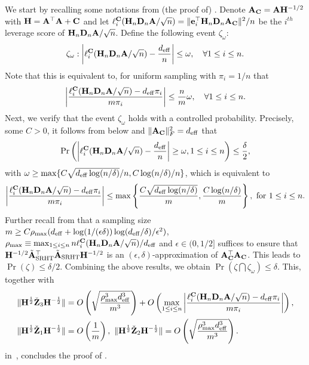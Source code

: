 \documentclass[11pt,a4paper]{article}
\begin{document}
We start by recalling some notations from (the proof of) . 
Denote  $\mathbf{A}_{\mathbf{C}}=\mathbf{A}\mathbf{H}^{-1/2}$ with $\mathbf{H}=\mathbf{A}^\top\mathbf{A}+\mathbf{C}$ and let $\ell_i^{\mathbf{C}}(\mathbf{H}_n\mathbf{D}_n\mathbf{A}/\sqrt{n}) =\|\mathbf{e}_i^\top\mathbf{H}_n\mathbf{D}_n\mathbf{A}_{\mathbf{C}}\|^2/n$ be the  $i^{th}$ leverage score of $\mathbf{H}_n\mathbf{D}_n\mathbf{A}/\sqrt{n}$. 
Define the following event $\zeta_{\omega}$:
\begin{align*}
\zeta_{\omega}: \left| \ell^{\mathbf{C}}_i(\mathbf{H}_n\mathbf{D}_n\mathbf{A}/\sqrt{n}) -\frac{d_{\mathrm{eff}}}{n}\right| \leq \omega,\quad \forall 1\leq i\leq n.
\end{align*}
Note that this is equivalent to, for uniform sampling with $\pi_i=1/n$ that
\begin{align*}
 \left| \frac{\ell^{\mathbf{C}}_{i}(\mathbf{H}_n\mathbf{D}_n\mathbf{A}/\sqrt{n}) -d_{\mathrm{eff}}\pi_{i}}{m\pi_{i}}\right| \leq\frac{n}{m}\omega,\quad\forall 1 \leq i\leq n.
\end{align*}
Next, we  verify that the event $\zeta_{\omega}$ holds with a controlled probability. 
Precisely, 
some $C>0$, it follows from  below and $\|\mathbf{A}_{\mathbf{C}}\|_F^2=d_{\mathrm{eff}}$ that
\begin{align}\label{eq:pr_lev_srht}
\Pr\left( \left|\ell_i^{\mathbf{C}}(\mathbf{H}_n\mathbf{D}_n\mathbf{A}/\sqrt{n})-\frac{d_{\mathrm{eff}}}{n} \right|\geq \omega,1\leq i\leq n\right)\leq \frac{\delta}{2},
\end{align}
with $\omega\geq \max\{C\sqrt{d_{\mathrm{eff}}\log(n/\delta)}/n,C\log(n/\delta)/n\}$, which is equivalent to
\begin{align*}
 \left| \frac{\ell^{\mathbf{C}}_{i}(\mathbf{H}_n\mathbf{D}_n\mathbf{A}/\sqrt{n}) -d_{\mathrm{eff}}\pi_{i}}{m\pi_{i}}\right| \leq \max\left\{\frac{C\sqrt{d_{\mathrm{eff}}\log(n/\delta)}}{m},\frac{C\log(n/\delta)}{m}\right\},~\text{for}~1\leq i\leq n.
\end{align*}
Further recall from \citet[Lemma 1]{lacotte2021adaptive} that a sampling size  $m\geq C\rho_{\max}(d_{\mathrm{eff}}+\log(1/(\epsilon\delta))\log(d_{\mathrm{eff}}/\delta)/\epsilon^2)$, $\rho_{\max}\equiv \max_{1\leq i \leq n}n\ell^{\mathbf{C}}_i (\mathbf{H}_n \mathbf{D}_n \mathbf{A}/\sqrt{n})/d_{\mathrm{eff}}$ and $\epsilon\in(0, 1/2]$ suffices to ensure that $\mathbf{H}^{-1/2}\tilde{\mathbf{A}}_{\rm SRHT}^\top \tilde{\mathbf{A}}_{\rm SRHT}\mathbf{H}^{-1/2}$ is an $(\epsilon,\delta)$-approximation of $\mathbf{A}_{\mathbf{C}}^\top\mathbf{A}_{\mathbf{C}}$.  
This leads to  $\Pr(\zeta)\leq \delta/2$. 
Combining the above results, we obtain $\Pr(\zeta \bigcap \zeta_{\omega})\leq \delta$.     
This, together with
\begin{align*}
     &\|\mathbf{H}^{\frac{1}{2}}\check{\mathbf{Z}}_3\mathbf{H}^{-\frac{1}{2}}\|
      = O\left(\sqrt{\frac{\rho_{\max}^3 d^3_{\mathrm{eff}}}{m^3}}\right)+ O\left(\max\limits_{1\leq i\leq n} \left| \frac{\ell^{\mathbf{C}}_{i}(\mathbf{H}_n\mathbf{D}_n\mathbf{A}/\sqrt{n}) -d_{\mathrm{eff}}\pi_{i}}{m\pi_{i}}\right|\right), \\
     & \|\mathbf{H}^{\frac{1}{2}}\check{\mathbf{Z}}_1\mathbf{H}^{-\frac{1}{2}}\|= O\left(\frac{ 1}{m}\right),~    \|\mathbf{H}^{\frac{1}{2}}\check{\mathbf{Z}}_2\mathbf{H}^{-\frac{1}{2}}\|= O\left(\sqrt{\frac{\rho_{\max}^3 d^3_{\mathrm{eff}}}{m^3}}\right).
\end{align*}
in~, concludes the proof of .
\qedwhite
\end{document}
